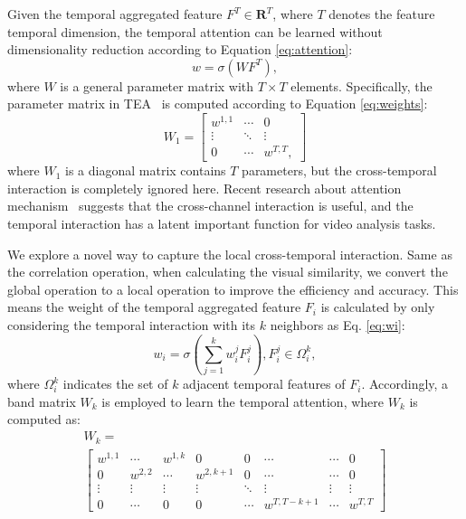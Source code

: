 \documentclass[journal]{IEEEtran}
\begin{document}
Given the temporal aggregated feature $F^{T} \in \mathbf{R}^{T}$, where $T$ denotes the feature temporal dimension, the temporal attention can be learned without dimensionality reduction according to Equation \ref{eq:attention}:
\begin{equation}\label{eq:attention}
  w = \sigma(WF^{T}),
\end{equation}
where $W$ is a general parameter matrix with $T \times T$ elements. Specifically, the parameter matrix in TEA~\cite{li2020tea} is computed according to Equation \ref{eq:weights}:
\begin{equation}\label{eq:weights}
  W_{1} =
  \begin{bmatrix}
      w^{1,1} & \cdots & 0 \\
      \vdots  & \ddots & \vdots \\
        0     & \cdots & w^{T,T},
  \end{bmatrix}
\end{equation}
where $W_{1}$ is a diagonal matrix contains $T$ parameters, but the cross-temporal interaction is completely ignored here. Recent research about attention mechanism~\cite{Wang_2020_CVPR_eca} suggests that the cross-channel interaction is useful, and the temporal interaction has a latent important function for video analysis tasks.

We explore a novel way to capture the local cross-temporal interaction. Same as the correlation operation, when calculating the visual similarity, we convert the global operation to a local operation to improve the efficiency and accuracy. This means the weight of the temporal aggregated feature $F_{i}$ is calculated by only considering the temporal interaction with its $k$ neighbors as Eq. \ref{eq:wi}:\begin{equation}\label{eq:wi}
  w_i = \sigma(\sum_{j=1}^{k}w^{j}_{i}F_{i}^{j}), F_{i}^{j}\in \Omega _{i}^{k},
\end{equation}
where $\Omega _{i}^{k}$ indicates the set of $k$ adjacent temporal features of $F_{i}$. Accordingly, a band matrix $W_{k}$ is employed to learn the temporal attention, where $W_{k}$ is computed as:
\begin{equation}\label{eq:wvar2}
\begin{aligned}
  W_{k} = \\
  \begin{bmatrix}
      w^{1,1} & \cdots  & w^{1,k} & 0         & 0       & \cdots        & \cdots & 0 \\
      0       & w^{2,2} & \cdots  & w^{2,k+1} & 0       & \cdots        & \cdots & 0 \\
      \vdots  & \vdots  & \vdots  & \vdots    & \ddots  & \vdots        & \vdots & \vdots \\
      0       & \cdots  & 0       & 0         & \cdots  & w^{T,T-k+1}   & \cdots & w^{T,T}
  \end{bmatrix}
\end{aligned}
\end{equation}
\end{document}
